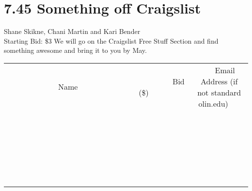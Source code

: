\documentclass[11pt]{article}
\begin{document}
\section*{7.45 Something off Craigslist}
Shane Skikne, Chani  Martin and Kari Bender
\\
Starting Bid: \$3
\newline
We will go on the Craigslist Free Stuff Section and find something awesome and bring it to you by May.
\\[6ex]
\begin{tabular}{c c c}
~~~~~~~~~~~~~Name~~~~~~~~~~~~~ & ~~~~~~~~~Bid (\$)~~~~~~~~~  & ~~~Email Address (if not standard olin.edu)~~~\\
 & & \\
\hline
 & & \\
\hline
 & & \\
\hline
 & & \\
\hline
 & & \\
\hline
 & & \\
\hline
 & & \\
\hline
 & & \\
\hline
 & & \\
\hline
 & & \\
\hline
 & & \\
\hline
 & & \\
\hline
 & & \\
\hline
 & & \\
\hline
 & & \\
\hline
 & & \\
\hline
 & & \\
\hline
 & & \\
\hline
 & & \\
\hline
 & & \\
\hline
 & & \\
\hline
 & & \\
\hline
 & & \\
\hline
 & & \\
\hline
 & & \\
\hline
 & & \\
\hline
\end{tabular}
\newpage
\end{document}
